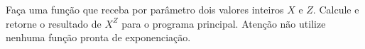 
\question[10]

Faça uma função que receba por parâmetro dois valores inteiros $X$ e $Z$. Calcule e retorne o resultado de $X^Z$ para o programa principal. Atenção não utilize nenhuma função pronta de exponenciação.